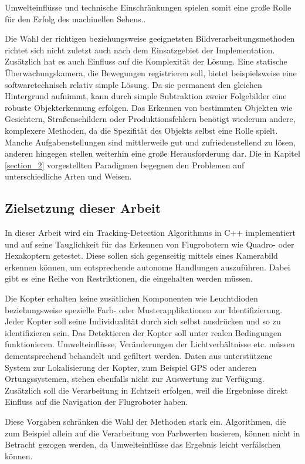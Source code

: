 Umwelteinflüsse und technische Einschränkungen spielen somit eine große Rolle für den Erfolg des machinellen Sehens.\cite{OTS}.

Die Wahl der richtigen beziehungsweise geeignetsten Bildverarbeitungsmethoden richtet sich nicht zuletzt auch nach dem Einsatzgebiet der Implementation. Zusätzlich hat es auch Einfluss auf die Komplexität der Lösung. Eine statische Überwachungskamera, die Bewegungen registrieren soll, bietet beispielsweise eine softwaretechnisch relativ simple Lösung. Da sie permanent den gleichen Hintergrund aufnimmt, kann durch simple Subtraktion zweier Folgebilder eine robuste Objekterkennung erfolgen. Das Erkennen von bestimmten Objekten wie Gesichtern, Straßenschildern oder Produktionsfehlern benötigt wiederum andere, komplexere Methoden, da die Spezifität des Objekts selbst eine Rolle spielt. Manche Aufgabenstellungen sind mittlerweile gut und zufriedenstellend zu lösen, anderen hingegen stellen weiterhin eine große Herausforderung dar. Die in Kapitel \ref{section_2} vorgestellten Paradigmen begegnen den Problemen auf unterschiedliche Arten und Weisen.

\subsection{Zielsetzung dieser Arbeit}
In dieser Arbeit wird ein Tracking-Detection Algorithmus in C++ implementiert und auf seine Tauglichkeit für das Erkennen von Flugrobotern wie Quadro- oder Hexakoptern getestet. Diese sollen sich gegenseitig mittels eines Kamerabild erkennen können, um entsprechende autonome Handlungen auszuführen. Dabei gibt es eine Reihe von Restriktionen, die eingehalten werden müssen.

Die Kopter erhalten keine zusätlichen Komponenten wie Leuchtdioden beziehungsweise spezielle Farb- oder Musterapplikationen zur Identifizierung. Jeder Kopter soll seine Individualität durch sich selbst ausdrücken und so zu identifizieren sein. Das Detektieren der Kopter soll unter realen Bedingungen funktionieren. Umwelteinflüsse, Veränderungen der Lichtverhältnisse etc. müssen dementsprechend behandelt und gefiltert werden. Daten aus unterstützene System zur Lokalisierung der Kopter, zum Beispiel GPS oder anderen Ortungssystemen, stehen ebenfalls nicht zur Auswertung zur Verfügung. Zusätzlich soll die Verarbeitung in Echtzeit erfolgen, weil die Ergebnisse direkt Einfluss auf die Navigation der Flugroboter haben.

Diese Vorgaben schränken die Wahl der Methoden stark ein. Algorithmen, die zum Beispiel allein auf die Verarbeitung von Farbwerten basieren, können nicht in Betracht gezogen werden, da Umwelteinflüsse das Ergebnis leicht verfälschen können.

